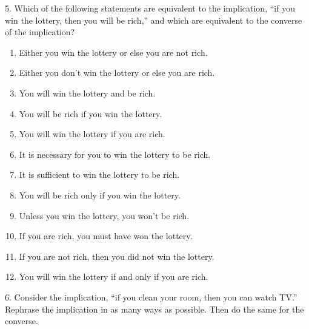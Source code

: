 \documentclass[10pt,]{book}
\theoremstyle{plain}
\theoremstyle{definition}
\theoremstyle{definition}
\theoremstyle{definition}
\theoremstyle{definition}
\numberwithin{equation}{chapter}
\begin{document}
\begin{exerciselist}
\begin{enumerate}[label=(\alph*)]
\end{enumerate}
\par\smallskip
\item[5.]\hypertarget{exercise-129}{}\hypertarget{p-1118}{}%
Which of the following statements are equivalent to the implication, ``if you win the lottery, then you will be rich,'' and which are equivalent to the converse of the implication?%
\leavevmode%
\begin{enumerate}[label=(\alph*)]
\item\hypertarget{li-553}{}\hypertarget{p-1119}{}%
Either you win the lottery or else you are not rich.%
\item\hypertarget{li-554}{}\hypertarget{p-1120}{}%
Either you don't win the lottery or else you are rich.%
\item\hypertarget{li-555}{}\hypertarget{p-1121}{}%
You will win the lottery and be rich.%
\item\hypertarget{li-556}{}\hypertarget{p-1122}{}%
You will be rich if you win the lottery.%
\item\hypertarget{li-557}{}\hypertarget{p-1123}{}%
You will win the lottery if you are rich.%
\item\hypertarget{li-558}{}\hypertarget{p-1124}{}%
It is necessary for you to win the lottery to be rich.%
\item\hypertarget{li-559}{}\hypertarget{p-1125}{}%
It is sufficient to win the lottery to be rich.%
\item\hypertarget{li-560}{}\hypertarget{p-1126}{}%
You will be rich only if you win the lottery.%
\item\hypertarget{li-561}{}\hypertarget{p-1127}{}%
Unless you win the lottery, you won't be rich.%
\item\hypertarget{li-562}{}\hypertarget{p-1128}{}%
If you are rich, you must have won the lottery.%
\item\hypertarget{li-563}{}\hypertarget{p-1129}{}%
If you are not rich, then you did not win the lottery.%
\item\hypertarget{li-564}{}\hypertarget{p-1130}{}%
You will win the lottery if and only if you are rich.%
\end{enumerate}
\par\smallskip
\item[6.]\hypertarget{exercise-130}{}\hypertarget{p-1144}{}%
Consider the implication, ``if you clean your room, then you can watch TV.'' Rephrase the implication in as many ways as possible. Then do the same for the converse.%
\par\smallskip

\end{exerciselist}
\end{document}
